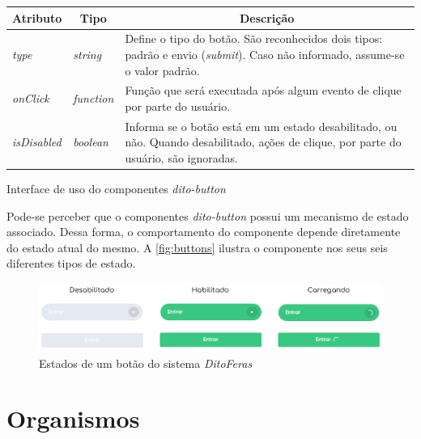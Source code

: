 \begin{quadro}
\centering
\begin{tabular}{|m{4cm}|m{3cm}|m{7cm}|} \hline
	
	\multicolumn{1}{|c|}{\bfseries Atributo} & \multicolumn{1}{c|}{\bfseries Tipo} & \multicolumn{1}{c|}{\bfseries Descrição} \\\hline
	
	 \textit{type} & \textit{string} & Define o tipo do botão. São reconhecidos dois tipos: padrão e envio (\textit{submit}). Caso não informado, assume-se o valor padrão. \\\hline
	 \textit{onClick} & \textit{function} & Função que será executada após algum evento de clique por parte do usuário. \\\hline
	 \textit{isDisabled} & \textit{boolean} & Informa se o botão está em um estado desabilitado, ou não. Quando desabilitado, ações de clique, por parte do usuário, são ignoradas. \\\hline
    
\end{tabular}
\caption{Interface de uso do componentes \textit{dito-button}}
\label{table:ditoButton}
\end{quadro}

Pode-se perceber que o componentes \textit{dito-button} possui um mecanismo de estado associado. Dessa forma, o comportamento do componente depende diretamente do estado atual do mesmo. A \autoref{fig:buttons} ilustra o componente nos seus seis diferentes tipos de estado.

\begin{figure}
  \begin{center}
	  \includegraphics[width=\linewidth]{./04-figuras/06_biblioteca_componentes/buttons.png}
	\end{center}
  \caption{Estados de um botão do sistema \textit{DitoFeras}}
  \label{fig:buttons}
\end{figure}

\section{Organismos}

